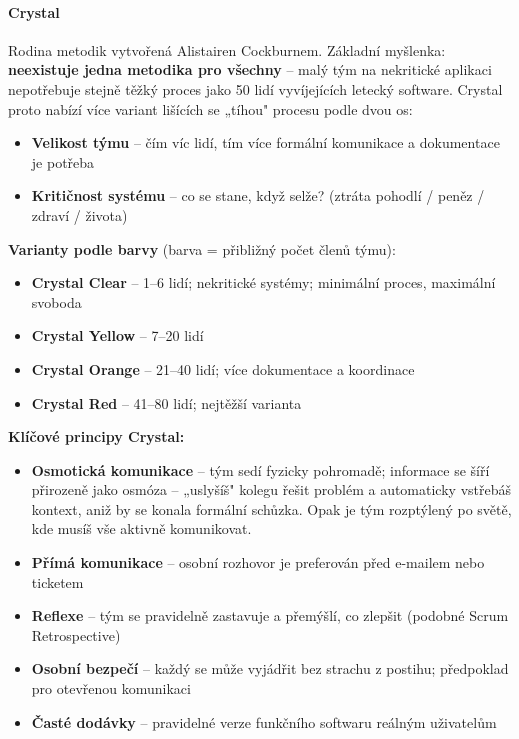 \paragraph{Crystal}
Rodina metodik vytvořená Alistairen Cockburnem. Základní myšlenka: \textbf{neexistuje jedna metodika pro všechny} -- malý tým na nekritické aplikaci nepotřebuje stejně těžký proces jako 50 lidí vyvíjejících letecký software. Crystal proto nabízí více variant lišících se „tíhou" procesu podle dvou os:
\begin{itemize}
  \item \textbf{Velikost týmu} -- čím víc lidí, tím více formální komunikace a dokumentace je potřeba
  \item \textbf{Kritičnost systému} -- co se stane, když selže? (ztráta pohodlí / peněz / zdraví / života)
\end{itemize}

\textbf{Varianty podle barvy} (barva = přibližný počet členů týmu):
\begin{itemize}
  \item \textbf{Crystal Clear} -- 1--6 lidí; nekritické systémy; minimální proces, maximální svoboda
  \item \textbf{Crystal Yellow} -- 7--20 lidí
  \item \textbf{Crystal Orange} -- 21--40 lidí; více dokumentace a koordinace
  \item \textbf{Crystal Red} -- 41--80 lidí; nejtěžší varianta
\end{itemize}

\textbf{Klíčové principy Crystal:}
\begin{itemize}
  \item \textbf{Osmotická komunikace} -- tým sedí fyzicky pohromadě; informace se šíří přirozeně jako osmóza -- „uslyšíš" kolegu řešit problém a automaticky vstřebáš kontext, aniž by se konala formální schůzka. Opak je tým rozptýlený po světě, kde musíš vše aktivně komunikovat.
  \item \textbf{Přímá komunikace} -- osobní rozhovor je preferován před e-mailem nebo ticketem
  \item \textbf{Reflexe} -- tým se pravidelně zastavuje a přemýšlí, co zlepšit (podobné Scrum Retrospective)
  \item \textbf{Osobní bezpečí} -- každý se může vyjádřit bez strachu z postihu; předpoklad pro otevřenou komunikaci
  \item \textbf{Časté dodávky} -- pravidelné verze funkčního softwaru reálným uživatelům
\end{itemize}

